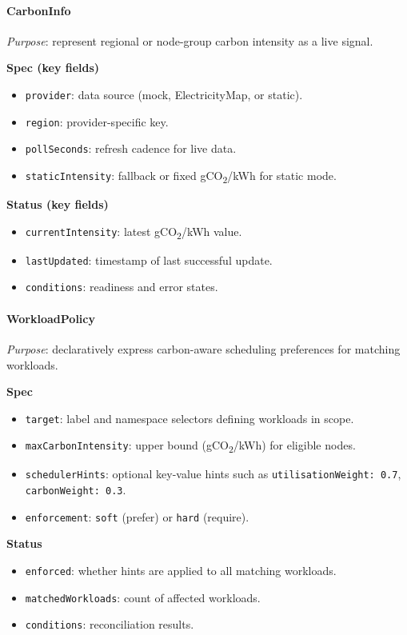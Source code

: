 \documentclass{article}
\begin{document}
\paragraph{CarbonInfo}
\textit{Purpose}: represent regional or node-group carbon intensity as a live signal.

\noindent\textbf{Spec (key fields)}
\begin{itemize}
  \item \texttt{provider}: data source (mock, ElectricityMap, or static).
  \item \texttt{region}: provider-specific key.
  \item \texttt{pollSeconds}: refresh cadence for live data.
  \item \texttt{staticIntensity}: fallback or fixed gCO\textsubscript{2}/kWh for static mode.
\end{itemize}

\noindent\textbf{Status (key fields)}
\begin{itemize}
  \item \texttt{currentIntensity}: latest gCO\textsubscript{2}/kWh value.
  \item \texttt{lastUpdated}: timestamp of last successful update.
  \item \texttt{conditions}: readiness and error states.
\end{itemize}

\paragraph{WorkloadPolicy}
\textit{Purpose}: declaratively express carbon-aware scheduling preferences for matching workloads.

\noindent\textbf{Spec}
\begin{itemize}
  \item \texttt{target}: label and namespace selectors defining workloads in scope.
  \item \texttt{maxCarbonIntensity}: upper bound (gCO\textsubscript{2}/kWh) for eligible nodes.
  \item \texttt{schedulerHints}: optional key-value hints such as 
        \texttt{utilisationWeight: 0.7}, \texttt{carbonWeight: 0.3}.
  \item \texttt{enforcement}: \texttt{soft} (prefer) or \texttt{hard} (require).
\end{itemize}

\noindent\textbf{Status}
\begin{itemize}
  \item \texttt{enforced}: whether hints are applied to all matching workloads.
  \item \texttt{matchedWorkloads}: count of affected workloads.
  \item \texttt{conditions}: reconciliation results.
\end{itemize}
\end{document}
